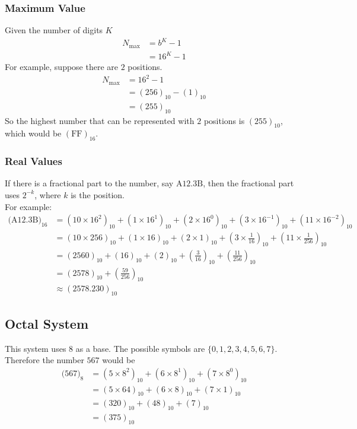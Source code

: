 \documentclass[../notes.tex]{subfiles}
\begin{document}
				\subsubsection{Maximum Value}
					Given the number of digits $K$
					\begin{align*}
						N_{\max} &= b^{K} - 1\\
						&= 16^{K} - 1
					\end{align*}
					For example, suppose there are $2$ positions.
					\begin{align*}
						N_{\max} &= 16^{2} - 1\\
						&= (256)_{10} - (1)_{10}\\
						&= (255)_{10}
					\end{align*}
					So the highest number that can be represented with $2$ positions is $(255)_{10}$, which would be $(\mathrm{FF})_{16}$.
				\subsubsection{Real Values}
					If there is a fractional part to the number, say $\mathrm{A}12.3\mathrm{B}$, then the fractional part uses $2^{-k}$, where $k$ is the position.\\
					For example:
					\begin{align*}
						\bigl(\mathrm{A}12.3\mathrm{B}\bigr)_{16} &= \left(10 \times 16^{2}\right)_{10} + \left(1 \times 16^{1}\right)_{10} + \left(2 \times 16^{0}\right)_{10} + \left(3 \times 16^{-1}\right)_{10} + \left(11 \times 16^{-2}\right)_{10}\\
						&= (10 \times 256)_{10} + (1 \times 16)_{10} + (2 \times 1)_{10} + \left(3 \times \frac{1}{16}\right)_{10} + \left(11 \times \frac{1}{256}\right)_{10}\\
						&= (2560)_{10} + (16)_{10} + (2)_{10} + \left(\frac{3}{16}\right)_{10} + \left(\frac{11}{256}\right)_{10}\\
						&= (2578)_{10} + \left(\frac{59}{256}\right)_{10}\\
						& \approx (2578.230)_{10}
					\end{align*}
			\pagebreak
			\subsection{Octal System}
				This system uses $8$ as a base. The possible symbols are $\{0, 1, 2, 3, 4, 5, 6, 7\}$.\\
				Therefore the number $567$ would be
				\begin{align*}
					\bigl(567\bigr)_{8} &= \left(5 \times 8^{2}\right)_{10} + \left(6 \times 8^{1}\right)_{10} + \left(7 \times 8^{0}\right)_{10}\\
					&= (5 \times 64)_{10} + (6 \times 8)_{10} + (7 \times 1)_{10}\\
					&= (320)_{10} + (48)_{10} + (7)_{10}\\
					&= (375)_{10}
				\end{align*}
\end{document}
